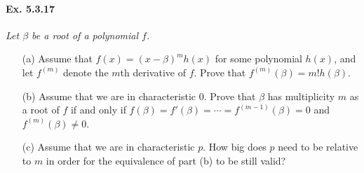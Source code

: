 \documentclass[11pt,a4paper]{article}
\begin{document}
\paragraph{Ex. 5.3.17}

{\it Let $\beta$ be a root of a polynomial $f$.
\begin{enumerate}
\item[(a)]  Assume that $f(x) = (x-\beta)^m h(x)$ for some polynomial $h(x)$, and let $f^{(m)}$ denote the $m$th derivative of $f$. Prove that $f^{(m)}(\beta) = m!h(\beta)$.
\item[(b)] Assume that we are in characteristic 0. Prove that $\beta$ has multiplicity $m$ as a root of $f$ if and only if $f(\beta) = f'(\beta)=\cdots = f^{(m-1)}(\beta) = 0$ and $f^{(m)}(\beta) \neq 0$.
\item[(c)] Assume that we are in characteristic $p$. How big does $p$ need to be relative to $m$ in order for the equivalence of part (b) to be still valid?
\end{enumerate}
}
\end{document}
